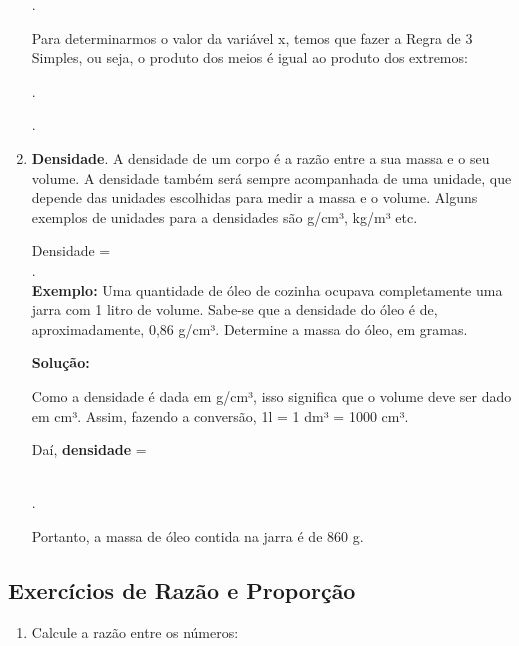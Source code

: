 \begin{multicols*}{2}
\begin{enumerate}
		.
		
		Para determinarmos o valor da variável x, temos que fazer a Regra de 3 Simples, ou seja, o produto dos meios é igual ao produto dos extremos:
		
		.
		
		.
		
		\item \textbf{Densidade}. A densidade de um corpo é a razão entre a sua massa e o seu volume. A densidade também será sempre acompanhada de uma unidade, que depende das unidades escolhidas para medir a massa e o volume. Alguns exemplos de unidades para a densidades são g/cm³, kg/m³ etc.

Densidade = \\

.\\

\textbf{Exemplo:} Uma quantidade de óleo de cozinha ocupava completamente uma jarra com 1 litro de volume. Sabe-se que a densidade do óleo é de, aproximadamente, 0,86 g/cm³.  Determine a massa do óleo, em gramas.

\textbf{Solução:}

Como a densidade é dada em g/cm³, isso significa que o volume deve ser dado em cm³. Assim, fazendo a conversão, 1l = 1 dm³ = 1000 cm³.

Daí, \textbf{densidade} =

\\

.

Portanto, a massa de óleo contida na jarra é de 860 g.
		
		\end{enumerate}
		
\subsection{Exercícios de Razão e Proporção}
		
		\begin{enumerate}
		
		\item Calcule a razão entre os números:


\end{enumerate}
\end{multicols*}
